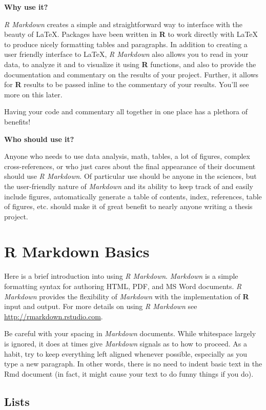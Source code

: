 \documentclass[12pt,twoside]{dukestatscithesis}
\theoremstyle{definition}
\theoremstyle{definition}
\theoremstyle{definition}
\theoremstyle{remark}
\begin{document}
\textbf{Why use it?}

\emph{R Markdown} creates a simple and straightforward way to interface
with the beauty of LaTeX. Packages have been written in \textbf{R} to
work directly with LaTeX to produce nicely formatting tables and
paragraphs. In addition to creating a user friendly interface to LaTeX,
\emph{R Markdown} also allows you to read in your data, to analyze it
and to visualize it using \textbf{R} functions, and also to provide the
documentation and commentary on the results of your project. Further, it
allows for \textbf{R} results to be passed inline to the commentary of
your results. You'll see more on this later.

Having your code and commentary all together in one place has a plethora
of benefits!

\textbf{Who should use it?}

Anyone who needs to use data analysis, math, tables, a lot of figures,
complex cross-references, or who just cares about the final appearance
of their document should use \emph{R Markdown}. Of particular use should
be anyone in the sciences, but the user-friendly nature of
\emph{Markdown} and its ability to keep track of and easily include
figures, automatically generate a table of contents, index, references,
table of figures, etc. should make it of great benefit to nearly anyone
writing a thesis project.

\hypertarget{rmd-basics}{\chapter{R Markdown Basics}\label{rmd-basics}}

Here is a brief introduction into using \emph{R Markdown}.
\emph{Markdown} is a simple formatting syntax for authoring HTML, PDF,
and MS Word documents. \emph{R Markdown} provides the flexibility of
\emph{Markdown} with the implementation of \textbf{R} input and output.
For more details on using \emph{R Markdown} see
\url{http://rmarkdown.rstudio.com}.

Be careful with your spacing in \emph{Markdown} documents. While
whitespace largely is ignored, it does at times give \emph{Markdown}
signals as to how to proceed. As a habit, try to keep everything left
aligned whenever possible, especially as you type a new paragraph. In
other words, there is no need to indent basic text in the Rmd document
(in fact, it might cause your text to do funny things if you do).

\section{Lists}\label{lists}
\end{document}
